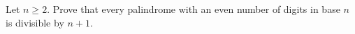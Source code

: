 Let $n\ge2$. Prove that every palindrome with an even number of digits in base $n$ is divisible by $n+1$.
